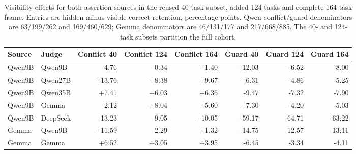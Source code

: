 \begin{table}[t]
\centering
\small
\caption{Visibility effects for both assertion sources in the reused 40-task subset, added 124 tasks and complete 164-task frame. Entries are hidden minus visible correct retention, percentage points. Qwen conflict/guard denominators are 63/199/262 and 169/460/629; Gemma denominators are 46/131/177 and 217/668/885. The 40- and 124-task subsets partition the full cohort.}
\label{tab:s_task_splits}
\begin{tabular}{llrrrrrr}
\toprule
Source & Judge & Conflict 40 & Conflict 124 & Conflict 164 & Guard 40 & Guard 124 & Guard 164 \\
\midrule
Qwen9B & Qwen9B & -4.76 & -0.34 & -1.40 & -12.03 & -6.52 & -8.00 \\
Qwen9B & Qwen27B & +13.76 & +8.38 & +9.67 & -6.31 & -4.86 & -5.25 \\
Qwen9B & Qwen35B & +7.41 & +6.03 & +6.36 & -9.47 & -7.32 & -7.90 \\
Qwen9B & Gemma & -2.12 & +8.04 & +5.60 & -7.30 & -4.20 & -5.03 \\
Qwen9B & DeepSeek & -13.23 & -9.05 & -10.05 & -59.17 & -64.71 & -63.22 \\
Gemma & Qwen9B & +11.59 & -2.29 & +1.32 & -14.75 & -12.57 & -13.11 \\
Gemma & Gemma & +6.52 & +3.05 & +3.95 & -6.45 & -3.34 & -4.11 \\
\bottomrule
\end{tabular}
\end{table}

